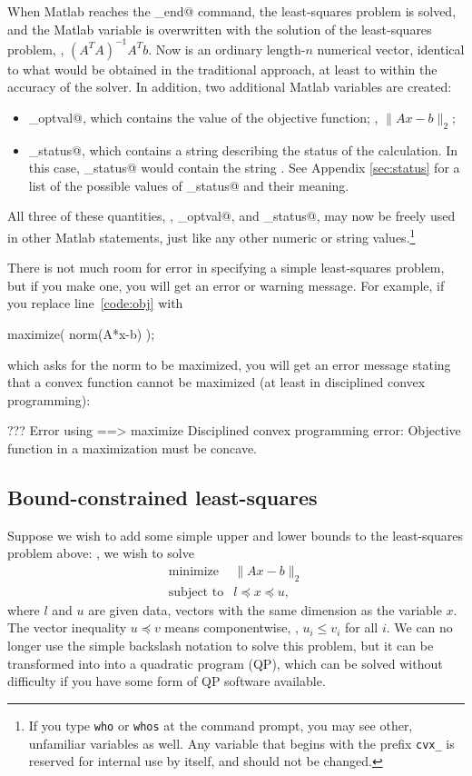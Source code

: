 \documentclass[12pt]{article}
\begin{document}
When Matlab reaches the \verb@cvx_end@ command, the least-squares
problem is solved,
and the Matlab variable \verb@x@ is overwritten
with the solution of the least-squares problem, \ie, $(A^TA)^{-1}A^Tb$.
Now \verb@x@ is an ordinary length-$n$ numerical vector, identical
to what would be obtained in the traditional approach, at least to
within the accuracy of the solver. In addition, two additional Matlab
variables are created:
\begin{itemize}
\item \verb@cvx_optval@, which contains the value of the objective
function; \ie, $\|Ax-b\|_2$;
\item \verb@cvx_status@, which contains a string describing the
status of the calculation. In this case, \verb@cvx_status@
would contain the string \verb@Solved@. See Appendix \ref{sec:status}
for a list of the possible values of \verb@cvx_status@ and their meaning.
\end{itemize}
All three of these quantities, \verb@x@, \verb@cvx_optval@, and
\verb@cvx_status@, may now be freely used in other Matlab
statements, just like any other numeric or string values.\footnote{If you type
\texttt{who} or \texttt{whos} at the command prompt, you may see other, unfamiliar
variables as well. Any variable that begins with the prefix \texttt{cvx\_} is 
reserved for internal use by \cvx itself, and should not be changed.}

There is not much room for error in specifying a simple least-squares
problem, but if you make one, you will get an error or warning message.
For example, if you replace line~\ref{code:obj} with
\begin{code}
	maximize( norm(A*x-b) );
\end{code}
which asks for the norm to be maximized, you will get an error message
stating that a convex function cannot be maximized (at least in
disciplined convex programming):
\begin{code}
??? Error using ==> maximize
Disciplined convex programming error:
Objective function in a maximization must be concave.
\end{code}

\subsection{Bound-constrained least-squares}
\label{sec:bcls}

Suppose we wish to add some simple upper and
lower bounds to the least-squares problem above: \ie, we wish to solve 
\begin{equation}
\begin{array}{ll}
\mbox{minimize} & \|Ax-b\|_2\\
\mbox{subject to} & l \preceq x \preceq u,
\end{array}
\label{eq:bcls}
\end{equation}
where $l$ and $u$ are given data, vectors with the same dimension
as the variable $x$.
The vector inequality $u \preceq v$ means componentwise, \ie,
$u_i \leq v_i$ for all $i$. We can no longer use the simple
backslash notation to solve this problem, but it can be transformed into
into a quadratic program (QP), which can be solved without difficulty
if you have some form
of QP software available. 
\end{document}
